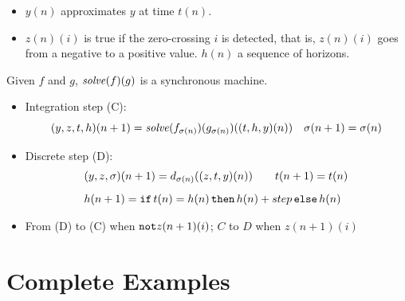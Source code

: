 \documentclass[11pt,titlepage,twoside]{report}
\newcommand{\Not}{\mbox{{\tt not}}}
\begin{document}
\begin{itemize}
\item
$y(n)$ approximates $y$ at time $t(n)$.
\item
$z(n)(i)$ is true if the zero-crossing $i$ is detected, that is,
$z(n)(i)$ goes from a negative to a positive value. $h(n)$ a sequence of horizons.
\end{itemize}
Given $f$ and $g$, $\mathit{solve}({f})({g})$ is a synchronous machine.

\begin{center}
\end{center}

\begin{itemize}
\item Integration step (C):
\[
(y, z, t, h)(n+1) = 
                 \mathit{solve}({f_{\sigma(n)}})({g_{\sigma(n)}})((t, h, y)(n))
\quad \sigma(n+1) = \sigma(n)
\]
\item Discrete step (D):
\[
\begin{array}{l}
 (y, z, \sigma)(n+1) = d_{\sigma(n)}((z, t, y)(n)) \quad \quad
 t(n+1) = t(n) \\[2ex]
 h(n+1) = \mathtt{if}\,{t(n) = h(n)}\,\mathtt{then}\,{h(n)+step}\,\mathtt{else}\,{h(n)}
\end{array}
\]
\item From (D) to (C) when $\Not{z(n+1)}(i)$; $C$ to $D$ when $z(n+1)(i)$
\end{itemize}


\chapter{Complete Examples}
\label{chapter:complete-examples}
\end{document}
